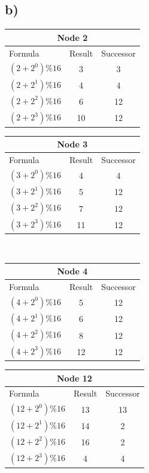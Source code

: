 \documentclass{article}
\begin{document}
    \subsection*{b)}
    
      \begin{tabular}{ |l|c|c| } 
      	\hline
      	\multicolumn{3}{|c|}{Node 2} \\
      	\hline
      	Formula & Result & Successor \\
      	\hline
      	$(2+2^0)\%16$ & 3 & 3 \\ 
      	$(2+2^1)\%16$ & 4 & 4 \\ 
      	$(2+2^2)\%16$ & 6 & 12 \\ 
      	$(2+2^3)\%16$ & 10 & 12 \\
      	\hline
      \end{tabular}
      \quad
  	  \begin{tabular}{ |l|c|c| } 
  	  	\hline
  	  	\multicolumn{3}{|c|}{Node 3} \\
  	  	\hline
  	  	Formula & Result & Successor \\
  	  	\hline
  	  	$(3+2^0)\%16$ & 4 & 4 \\ 
  	  	$(3+2^1)\%16$ & 5 & 12 \\ 
  	  	$(3+2^2)\%16$ & 7 & 12 \\ 
  	  	$(3+2^3)\%16$ & 11 & 12 \\
  	  	\hline
  	  \end{tabular} \\
      \quad
      \begin{tabular}{ |l|c|c| } 
      	\hline
      	\multicolumn{3}{|c|}{Node 4} \\
      	\hline
      	Formula & Result & Successor \\
      	\hline
      	$(4+2^0)\%16$ & 5 & 12 \\ 
      	$(4+2^1)\%16$ & 6 & 12 \\ 
      	$(4+2^2)\%16$ & 8 & 12 \\ 
      	$(4+2^3)\%16$ & 12 & 12 \\
      	\hline
      \end{tabular}
      \quad
      \begin{tabular}{ |l|c|c| } 
      	\hline
      	\multicolumn{3}{|c|}{Node 12} \\
      	\hline
      	Formula & Result & Successor \\
      	\hline
      	$(12+2^0)\%16$ & 13 & 13 \\ 
      	$(12+2^1)\%16$ & 14 & 2 \\ 
      	$(12+2^2)\%16$ & 16 & 2 \\ 
      	$(12+2^3)\%16$ & 4 & 4 \\
      	\hline
      \end{tabular}\\
\end{document}
